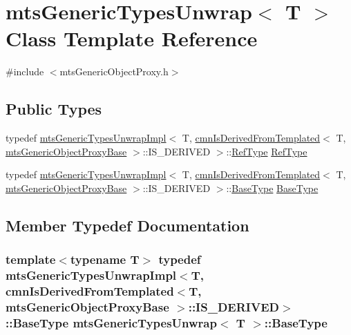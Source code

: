 \hypertarget{classmts_generic_types_unwrap}{}\section{mts\+Generic\+Types\+Unwrap$<$ T $>$ Class Template Reference}
\label{classmts_generic_types_unwrap}


{\ttfamily \#include $<$mts\+Generic\+Object\+Proxy.\+h$>$}

\subsection*{Public Types}
\begin{DoxyCompactItemize}
\item 
typedef \hyperlink{classmts_generic_types_unwrap_impl}{mts\+Generic\+Types\+Unwrap\+Impl}$<$ T, \hyperlink{classcmn_is_derived_from_templated}{cmn\+Is\+Derived\+From\+Templated}$<$ T, \hyperlink{classmts_generic_object_proxy_base}{mts\+Generic\+Object\+Proxy\+Base} $>$\+::I\+S\+\_\+\+D\+E\+R\+I\+V\+E\+D $>$\+::\hyperlink{classmts_generic_types_unwrap_a24e5f78383cd6567646fcdc413d02420}{Ref\+Type} \hyperlink{classmts_generic_types_unwrap_a24e5f78383cd6567646fcdc413d02420}{Ref\+Type}
\item 
typedef \hyperlink{classmts_generic_types_unwrap_impl}{mts\+Generic\+Types\+Unwrap\+Impl}$<$ T, \hyperlink{classcmn_is_derived_from_templated}{cmn\+Is\+Derived\+From\+Templated}$<$ T, \hyperlink{classmts_generic_object_proxy_base}{mts\+Generic\+Object\+Proxy\+Base} $>$\+::I\+S\+\_\+\+D\+E\+R\+I\+V\+E\+D $>$\+::\hyperlink{classmts_generic_types_unwrap_a380693b0f12de3c3610bbb252b6fe082}{Base\+Type} \hyperlink{classmts_generic_types_unwrap_a380693b0f12de3c3610bbb252b6fe082}{Base\+Type}
\end{DoxyCompactItemize}


\subsection{Member Typedef Documentation}
\hypertarget{classmts_generic_types_unwrap_a380693b0f12de3c3610bbb252b6fe082}{}
\subsubsection[{Base\+Type}]{\setlength{\rightskip}{0pt plus 5cm}template$<$typename T$>$ typedef {\bf mts\+Generic\+Types\+Unwrap\+Impl}$<$T, {\bf cmn\+Is\+Derived\+From\+Templated}$<$T, {\bf mts\+Generic\+Object\+Proxy\+Base} $>$\+::I\+S\+\_\+\+D\+E\+R\+I\+V\+E\+D$>$\+::{\bf Base\+Type} {\bf mts\+Generic\+Types\+Unwrap}$<$ T $>$\+::{\bf Base\+Type}}\label{classmts_generic_types_unwrap_a380693b0f12de3c3610bbb252b6fe082}
\hypertarget{classmts_generic_types_unwrap_a24e5f78383cd6567646fcdc413d02420}{}
